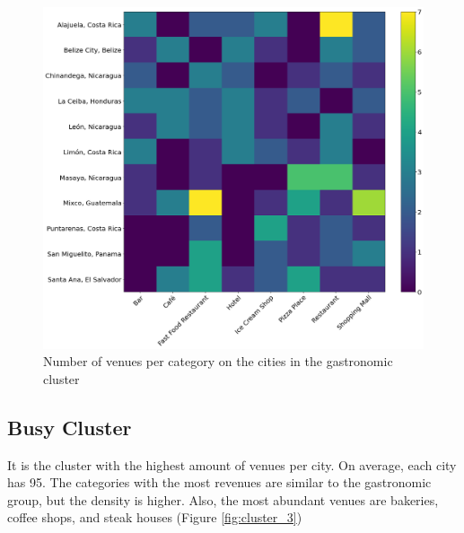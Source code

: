 \documentclass[letterpaper,12pt]{article}
\begin{document}
\begin{figure}[h]
    \centering
    \includegraphics[width=\textwidth]{images/cluster2.png}
    \caption{Number of venues per category on the cities in the gastronomic cluster}
    \label{fig:cluster_2}
\end{figure}


\subsection{Busy Cluster}

It is the cluster with the highest amount of venues per city. On average, each city has 95. The categories with the most revenues are similar to the gastronomic group, but the density is higher. Also, the most abundant venues are bakeries, coffee shops, and steak houses (Figure \ref{fig:cluster_3})
\end{document}
